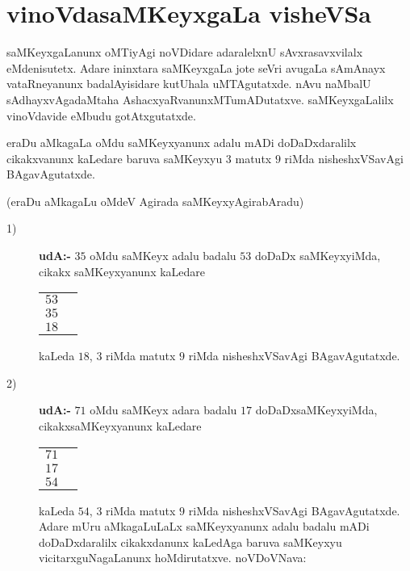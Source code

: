 \chapter{vinoVdasaMKeyxgaLa visheVSa}

saMKeyxgaLanunx oMTiyAgi noVDidare adaralelxnU sAvxrasavxvilalx eMdenisutetx. Adare ininxtara saMKeyxgaLa jote seVri avugaLa sAmAnayx vataRneyanunx badalAyisidare kutUhala uMTAgutatxde. nAvu naMbalU sAdhayxvAgadaMtaha AshacxyaRvanunxMTumADutatxve. saMKeyxgaLalilx vinoVdavide eMbudu gotAtxgutatxde.

eraDu aMkagaLa oMdu saMKeyxyanunx adalu mADi doDaDxdaralilx cikakxvanunx kaLedare baruva saMKeyxyu $3$ matutx $9$ riMda nisheshxVSavAgi BAgavAgutatxde.

(eraDu aMkagaLu oMdeV Agirada saMKeyxyAgirabAradu)
\begin{description}
\item[{\rm 1)}] {\bf udA:-} $35$ oMdu saMKeyx adalu badalu $53$ doDaDx saMKeyxyiMda, cikakx saMKeyxyanunx kaLedare
  \begin{center}
\begin{tabular}{cc}
  $53$&\\
  $35$&\\\cline{1-1}
  $18$&
\end{tabular}
  \end{center}
  kaLeda $18$, $3$ riMda matutx $9$ riMda nisheshxVSavAgi BAgavAgutatxde.
  
\item[{\rm 2)}] {\bf udA:-} $71$ oMdu saMKeyx adara badalu $17$ doDaDxsaMKeyxyiMda, cikakxsaMKeyxyanunx kaLedare
    \begin{center}
\begin{tabular}{cc}
  $71$&\\
  $17$&\\\cline{1-1}
  $54$&
\end{tabular}
  \end{center}

    kaLeda $54$, $3$ riMda matutx $9$ riMda nisheshxVSavAgi BAgavAgutatxde. Adare mUru aMkagaLuLaLx saMKeyxyanunx adalu badalu mADi doDaDxdaralilx cikakxdanunx kaLedAga baruva saMKeyxyu vicitarxguNagaLanunx hoMdirutatxve. noVDoVNava:
\end{description}

